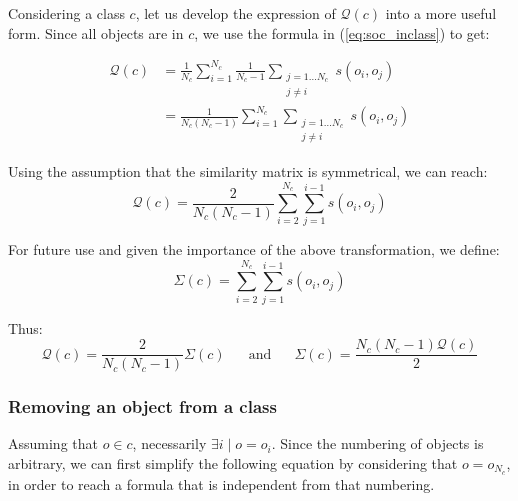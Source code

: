 \documentclass[twoside,11pt]{article}
\begin{document}
Considering a class $c$, let us develop the expression of $\mathcal{Q}(c)$ into a more useful form. Since all objects are in $c$, we use the formula in (\ref{eq:soc_inclass}) to get:

\begin{equation*}
  \begin{aligned}
    \mathcal{Q}\left(c\right) & = \frac{1}{N_c} \sum_{i=1}^{N_c} \frac{1}{N_c-1} \sum_{\substack{j=1 \ldots N_c\\j \neq i}} s\left(o_i, o_j\right) \\
                              & = \frac{1}{N_c(N_c-1)} \sum_{i=1}^{N_c} \sum_{\substack{j=1 \ldots N_c\\j \neq i}} s\left(o_i, o_j\right)
  \end{aligned}
\end{equation*}

Using the assumption that the similarity matrix is symmetrical, we can reach: %
\begin{equation}
    \mathcal{Q}\left(c\right) = \frac{2}{N_c(N_c-1)} \sum_{i=2}^{N_c} \sum_{j=1}^{i-1} s\left(o_i, o_j\right)
    \label{eq:classQuality}
\end{equation}

For future use and given the importance of the above transformation, we define:
\[
  \Sigma(c) = \sum_{i=2}^{N_c} \sum_{j=1}^{i-1} s\left(o_i, o_j\right)
\]

Thus:
\[
\mathcal{Q}\left(c\right) = \frac{2}{N_c(N_c-1)}\Sigma(c) \phantom{XX}\mathrm{and}\phantom{XX} \Sigma(c) = \frac{N_c(N_c-1)\mathcal{Q}\left(c\right)}{2}
\]

\subsubsection{Removing an object from a class}

Assuming that $o \in c$, necessarily $\exists i \mid o=o_i$. Since the numbering of objects is arbitrary, we can first simplify the following equation by considering that $o = o_{N_c}$, in order to reach a formula that is independent from that numbering.
\end{document}
